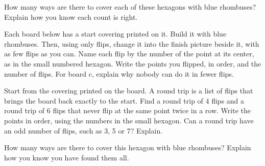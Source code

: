 \documentclass[12pt]{article}
\newcommand{\withpic}[3]{%
  \noindent\begin{minipage}[t]{#1}\vspace{0pt}\raggedright #2\end{minipage}\hfill
  \begin{minipage}[t]{\dimexpr 7.5in-#1-0.2in\relax}\vspace{2pt}\raggedleft\end{minipage}\par}
\begin{document}
\vspace{0.05in}

\newpage
{} How many ways are there to cover each of these hexagons with blue rhombuses? Explain how you know each count is right.

\vspace{0.1in}

\newpage
{}

\newpage
{}

\newpage
\withpic{4.75in}{ Each board below has a start covering printed on it. Build it with blue rhombuses. Then, using only flips, change it into the finish picture beside it, with as few flips as you can. Name each flip by the number of the point at its center, as in the small numbered hexagon. Write the points you flipped, in order, and the number of flips. For board c, explain why nobody can do it in fewer flips.}{g45-key}

\vspace{0.1in}

\newpage
{\raggedleft\par}
\vspace{0.05in}

\newpage
\withpic{4.75in}{ Start from the covering printed on the board. A round trip is a list of flips that brings the board back exactly to the start. Find a round trip of 4 flips and a round trip of 6 flips that never flip at the same point twice in a row. Write the points in order, using the numbers in the small hexagon. Can a round trip have an odd number of flips, such as 3, 5 or 7? Explain.}{g45-key}

\vspace{0.15in}

\newpage
{} How many ways are there to cover this hexagon with blue rhombuses? Explain how you know you have found them all.

\vspace{0.1in}
\end{document}
